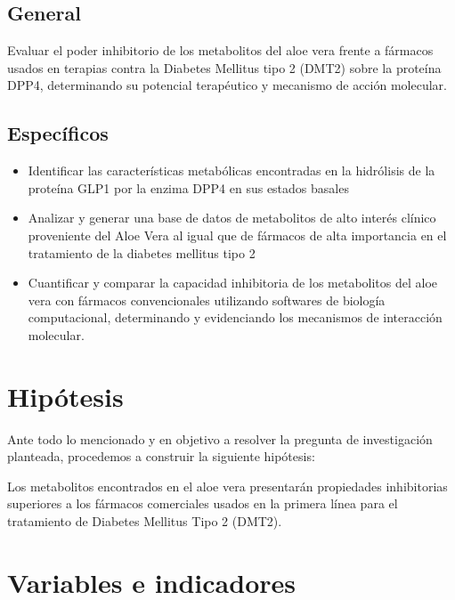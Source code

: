 \subsection{General}
Evaluar el poder inhibitorio de los metabolitos del aloe vera frente a fármacos usados en terapias contra la Diabetes Mellitus tipo 2 (DMT2) sobre la proteína DPP4, determinando su potencial terapéutico y mecanismo de acción molecular.

\subsection{Específicos}

\begin{itemize}
 \item Identificar las características metabólicas encontradas en la hidrólisis de la proteína GLP1 por la enzima DPP4 en sus estados basales
 \item Analizar y generar una base de datos de metabolitos de alto interés clínico proveniente del Aloe Vera al igual que de fármacos de alta importancia en el tratamiento de la diabetes mellitus tipo 2 
 \item Cuantificar y comparar la capacidad inhibitoria de los metabolitos del aloe vera con fármacos convencionales utilizando softwares de biología computacional, determinando y evidenciando los mecanismos de interacción molecular.

\end{itemize}

\section{Hipótesis}
Ante todo lo mencionado y en objetivo a resolver la pregunta de investigación planteada, procedemos a construir la siguiente hipótesis:

Los metabolitos encontrados en el aloe vera presentarán propiedades inhibitorias superiores a los fármacos comerciales usados en la primera línea para el tratamiento de Diabetes Mellitus Tipo 2 (DMT2).  


\section{Variables e indicadores}

